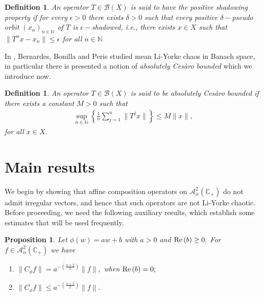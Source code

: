 \documentclass[11pt]{amsart}%
\numberwithin{equation}{section}
\theoremstyle{plain}
\newtheorem{dfn}[thm]{Definition}
\newtheorem{prop}[thm]{Proposition}
\theoremstyle{definition}
\theoremstyle{definition}
\newcommand{\re}{{\rm Re}\,}
\newcommand{\hb}{\mathbb{C}_+}
\newcommand{\Ber}{\mathcal{A}^2_{\alpha}(\hb)}
\begin{document}
\begin{dfn} An operator $T\in \mathcal{B}(X)$ is said to have the positive shadowing property if for every $\epsilon>0$ there exists $\delta > 0$ such that every positive $\delta-$pseudo orbit  $(x_{n})_{n\in \mathbb{N}}$ of $T$ is $\epsilon-$shadowed, i.e., there exists $x\in X$ such that  $\|T^{n}x - x_{n}\| \leq \epsilon$ for all $n\in \mathbb{N}$
\end{dfn}


In \cite{Bonilla}, Bernardes, Bonilla and Peris studied mean Li-Yorke chaos in Banach space, in particular there is presented a notion of \textit{absolutely Cesàro bounded} which we introduce now.

\begin{dfn} An operator $T\in \mathcal{B}(X)$ is said to be absolutely Cesàro bounded if there exists a constant $M>0$ such that 
\begin{align*}
\sup_{n\in \mathbb{N}}\left\lbrace\frac{1}{n}\sum_{j=1}^n\|T^jx\|\right\rbrace\leq M\|x\|, 
\end{align*}
for all $x\in X.$
\end{dfn}
\section{Main results}
We begin by showing that affine composition operators on $\Ber$ do not admit irregular vectors, and hence that such operators are not Li-Yorke chaotic. Before proceeding, we need the following auxiliary results, which establish some estimates that will be used frequently.


\begin{prop}\label{estimates} Let $\phi(w)=a w+b$ with $a>0$ and $\re(b)\geq0.$ For $f\in \Ber$ we have 
\begin{enumerate}[label=\textnormal{(\roman*)}]
\item $\|C_{\phi}f\|=a^{-\left(\frac{\alpha+2}{2}\right)}\|f\|,$ when $\re(b)=0;$
\item $\|C_{\phi}f\|\leq a ^{-\left(\frac{\alpha+2}{2}\right)}\|f\|.$
\end{enumerate}
\end{prop}
\end{document}
